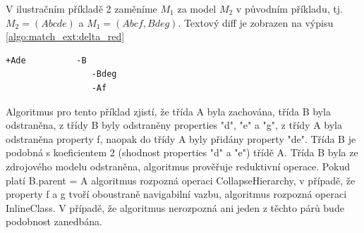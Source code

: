 \documentclass[11pt,twoside,a4paper]{book}
\begin{document}
 V ilustračním příkladě 2 zaměníme $M_1$
 za model $M_2$ v původním příkladu, tj. $M_2 = (Abcde)$ a $M_1 = (Abcf,
 Bdeg)$. Textový diff je zobrazen na výpisu \ref{algo:match_ext:delta_red}
 
  \begin{lstlisting}[frame=single,caption=Textový diff pro
 reduktivní operaci,label=algo:match_ext:delta_red]
   +Ade          -B            
                 -Bdeg          
                 -Af
\end{lstlisting}
 
 Algoritmus pro tento příklad zjistí, že třída A byla zachována, třída B byla
 odstraněna, z třídy B byly odstraněny properties "d", "e" a "g", z třídy A
 byla odstraněna property f, naopak do třídy A byly přidány property "de". Třída
 B je podobná s koeficientem 2 (shodnost properties "d" a "e") třídě A. Třída B
 byla ze zdrojového modelu odstraněna, algoritmus prověřuje reduktivní operace.
 Pokud platí B.parent = A algoritmus rozpozná operaci CollapseHierarchy, v
 případě, že property f a g tvoří oboustraně navigabilní vazbu, algoritmus
 rozpozná operaci InlineClass. V případě, že algoritmus nerozpozná ani jeden z
 těchto párů bude podobnost zanedbána.
\end{document}
